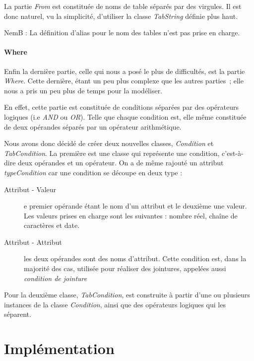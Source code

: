 \documentclass[oneside,13pt,a4paper]{report}
\newcommand\nb[1][0.3]{N\kern-#1emB : }
\begin{document}
La partie \textit{From} est constituée de noms de table séparés par des virgules. Il est donc naturel, vu la simplicité, d'utiliser la classe \textit{TabString} définie plus haut.

\nb La définition d'alias pour le nom des tables n'est pas prise en charge.

\subsubsection{Where}

Enfin la dernière partie, celle qui nous a posé le plus de difficultés, est la partie \textit{Where}. Cette dernière, étant un peu plus complexe que les autres parties ; elle nous a pris un peu plus de temps pour la modéliser.

En effet, cette partie est constituée de conditions séparées par des opérateurs logiques (i.e \textit{AND} ou \textit{OR}). Telle que chaque condition est, elle même constituée de deux opérandes séparés par un opérateur arithmétique.

Nous avons donc décidé de créer deux nouvelles classes, \textit{Condition} et \textit{TabCondition}. La première est une classe qui représente une condition, c'est-à-dire deux opérandes et un opérateur. On a de même rajouté un attribut \textit{typeCondition} car une condition se découpe en deux type :
\begin{description}
	\item[Attribut - Valeur] e premier opérande étant le nom d'un attribut et le deuxième une valeur. Les valeurs prises en charge sont les suivantes : nombre réel, chaîne de caractères et date.
	\item[Attribut - Attribut] les deux opérandes sont des noms d'attribut. Cette condition est, dans la majorité des cas, utilisée pour réaliser des jointures, appelées aussi \textit{condition de jointure}
\end{description}

Pour la deuxième classe, \textit{TabCondition}, est construite à partir d'une ou plusieurs instances de la classe \textit{Condition}, ainsi que des opérateurs logiques qui les séparent.



\chapter{Implémentation}
\end{document}
